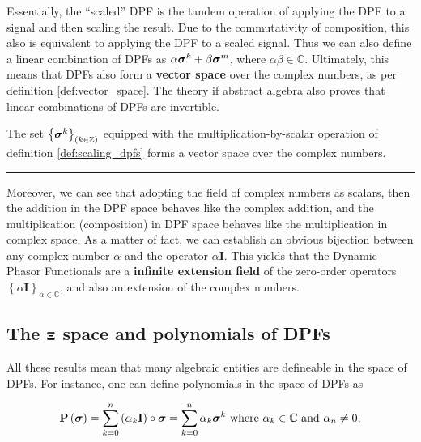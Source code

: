 	Essentially, the ``scaled'' DPF is the tandem operation of applying the DPF to a signal and then scaling the result. Due to the commutativity of composition, this also is equivalent to applying the DPF to a scaled signal. Thus we can also define a linear combination of DPFs as $\alpha\boldsymbol{\sigma}^{k} + \beta\boldsymbol{\sigma}^{m}$, where $\alpha\beta\in\mathbb{C}$. Ultimately, this means that DPFs also form a \textbf{vector space} over the complex numbers, as per definition \ref{def:vector_space}. The theory if abstract algebra also proves that linear combinations of DPFs are invertible.

\begin{theorem}\label{theo:vspace}%
	The set $\left\{\boldsymbol{\sigma}^{k}\right\}_{(k\in\mathbb{Z})}$ equipped with the multiplication-by-scalar operation of definition \ref{def:scaling_dpfs} forms a vector space over the complex numbers.
\end{theorem}
\vspace{5mm}
\hrule
\vspace{5mm}%

	Moreover, we can see that adopting the field of complex numbers as scalars, then the addition in the DPF space behaves like the complex addition, and the multiplication (composition) in DPF space behaves like the multiplication in complex space. As a matter of fact, we can establish an obvious bijection between any complex number $\alpha$ and the operator $\alpha\mathbf{I}$. This yields that the Dynamic Phasor Functionals are a \textbf{infinite extension field} of the zero-order operators $\left\{\alpha\mathbf{I}\right\}_{\alpha\in\mathbb{C}}$, and also an extension of the complex numbers. 

\subsection{The $\boldsymbol{\Xi}$ space and polynomials of DPFs} %

	All these results mean that many algebraic entities are defineable in the space of DPFs. For instance, one can define polynomials in the space of DPFs as

\begin{equation} \mathbf{P}\left(\boldsymbol{\sigma}\right) = \sum_{k=0}^n \left(\alpha_k\mathbf{I}\right)\circ \boldsymbol{\sigma} = \sum_{k=0}^n \alpha_k \boldsymbol{\sigma}^{k} \text{ where } \alpha_k\in\mathbb{C} \text{ and } \alpha_n\neq 0, \label{eq:def_dpo_poly}\end{equation}
	
